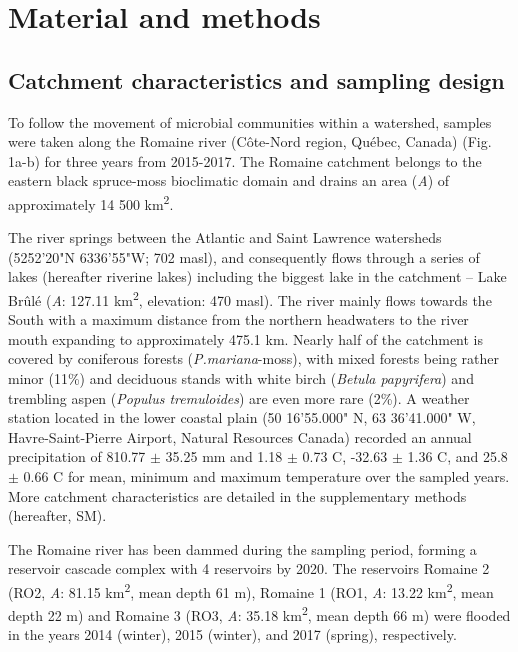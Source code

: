 \documentclass[12pt,a4paper]{article} %
\begin{document}
\section*{Material and methods}
\subsection*{Catchment characteristics and sampling design}
To follow the movement of microbial communities within a watershed, samples were taken along the Romaine river (C\^{o}te-Nord region, Qu\'{e}bec, Canada) (Fig. 1a-b) for three years from 2015-2017. The Romaine catchment belongs to the eastern black spruce-moss bioclimatic domain and drains an area (\textit{A}) of approximately 14 500 km\textsuperscript{2}.

The river springs between the Atlantic and Saint Lawrence watersheds (52\textdegree{}52'20"N 63\textdegree{}36'55"W; 702 masl), and consequently flows through a series of lakes (hereafter riverine lakes) including the biggest lake in the catchment – Lake Br\^{u}l\'{e} (\textit{A}: 127.11 km\textsuperscript{2}, elevation: 470 masl). The river mainly flows towards the South with a maximum distance from the northern headwaters to the river mouth expanding to approximately 475.1 km. Nearly half of the catchment is covered by coniferous forests (\textit{P.mariana}-moss), with mixed forests being rather minor (11\%) and deciduous stands with white birch (\textit{Betula papyrifera}) and trembling aspen (\textit{Populus tremuloides}) are even more rare (2\%)\citep{HQreport2009}.  A weather station located in the lower coastal plain (50\textdegree{} 16'55.000" N, 63\textdegree{} 36'41.000" W, Havre-Saint-Pierre Airport, Natural Resources Canada) recorded an annual precipitation of 810.77 $\pm$ 35.25 mm and 1.18 $\pm$ 0.73 \textdegree{}C, -32.63 $\pm$ 1.36 \textdegree{}C, and 25.8 $\pm$ 0.66 \textdegree{}C for mean, minimum and maximum temperature over the sampled years. More catchment characteristics are detailed in the supplementary methods (hereafter, SM).

The Romaine river has been dammed during the sampling period, forming a reservoir cascade complex with 4 reservoirs by 2020. The reservoirs Romaine 2 (RO2, \textit{A}: 81.15 km\textsuperscript{2}, mean depth 61 m), Romaine 1 (RO1, \textit{A}: 13.22 km\textsuperscript{2}, mean depth 22 m) and Romaine 3 (RO3, \textit{A}: 35.18 km\textsuperscript{2}, mean depth 66 m) were flooded in the years 2014 (winter), 2015 (winter), and 2017 (spring), respectively.
\end{document}
